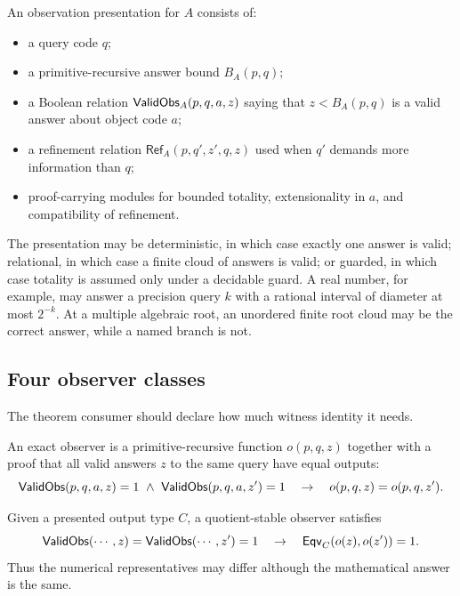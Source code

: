 \begin{definition}
An observation presentation for \(A\) consists of:
\begin{itemize}
\item a query code \(q\);
\item a primitive-recursive answer bound \(B_A(p,q)\);
\item a Boolean relation
  \(\mathsf{ValidObs}_A(p,q,a,z)\) saying that \(z<B_A(p,q)\) is a valid answer about
  object code \(a\);
\item a refinement relation
  \(\mathsf{Ref}_A(p,q',z',q,z)\) used when \(q'\) demands more information
  than \(q\);
\item proof-carrying modules for bounded totality, extensionality in \(a\), and
  compatibility of refinement.
\end{itemize}
\end{definition}

The presentation may be deterministic, in which case exactly one answer is
valid; relational, in which case a finite cloud of answers is valid; or
guarded, in which case totality is assumed only under a decidable guard.  A
real number, for example, may answer a precision query \(k\) with a rational
interval of diameter at most \(2^{-k}\).  At a multiple algebraic root, an
unordered finite root cloud may be the correct answer, while a named branch is
not.

\subsection{Four observer classes}

The theorem consumer should declare how much witness identity it needs.

\begin{definition}
An exact observer is a primitive-recursive function \(o(p,q,z)\) together with
a proof that all valid answers \(z\) to the same query have equal outputs:
\[
 \mathsf{ValidObs}(p,q,a,z)=1\ \wedge\
 \mathsf{ValidObs}(p,q,a,z')=1
 \quad\rightarrow\quad
 o(p,q,z)=o(p,q,z').
\]
\end{definition}

\begin{definition}
Given a presented output type \(C\), a quotient-stable observer satisfies
\[
  \mathsf{ValidObs}(\cdots,z)=\mathsf{ValidObs}(\cdots,z')=1
  \quad\rightarrow\quad
  \mathsf{Eqv}_C(o(z),o(z'))=1.
\]
Thus the numerical representatives may differ although the mathematical
answer is the same.
\end{definition}

